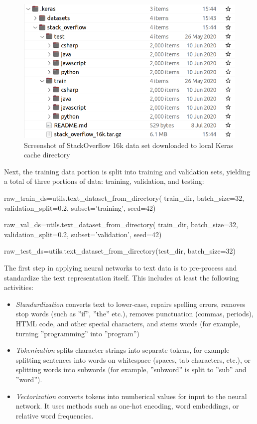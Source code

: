 \begin{figure}
\centering

\includegraphics[width=.75\textwidth]{screen9.png}
\caption[StackOverflow dataset in Keras cache directory]{Screenshot of StackOverflow 16k data set downloaded to local Keras cache directory}
\label{fig:screen9_chap16}
\end{figure}

Next, the training data portion is split into training and validation sets, yielding a total of three portions of data: training, validation, and testing:

\begin{samepage}
\begin{pythoncode}
raw_train_ds=utils.text_dataset_from_directory(
    train_dir, batch_size=32, validation_split=0.2,
    subset='training', seed=42)

raw_val_ds=utils.text_dataset_from_directory(
    train_dir, batch_size=32, validation_split=0.2,
    subset='validation', seed=42)

raw_test_ds=utils.text_dataset_from_directory(test_dir, batch_size=32)
\end{pythoncode}
\end{samepage}

The first step in applying neural networks to text data is to pre-process and standardize the text representation itself. This includes at least the following activities:

\begin{itemize}
   \item \emph{Standardization} converts text to lower-case, repairs spelling errors, removes stop words (such as ''if'', ''the'' etc.), removes punctuation (commas, periods), HTML code, and other special characters, and stems words (for example, turning ''programming'' into ''program'')
   \item \emph{Tokenization} splits character strings into separate tokens, for example splitting sentences into words on whitespace (spaces, tab characters, etc.), or splitting words into subwords (for example, ''subword'' is split to ''sub'' and ''word'').
   \item \emph{Vectorization} converts tokens into numberical values for input to the neural network. It uses methods such as one-hot encoding, word embeddings, or relative word frequencies.
\end{itemize}

